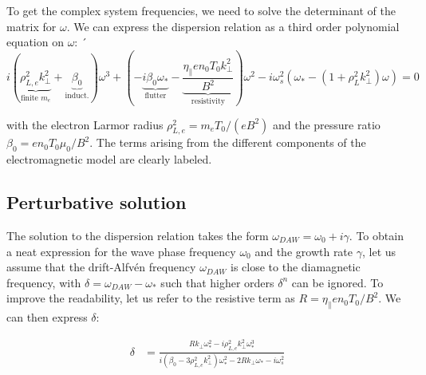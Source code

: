 To get the complex system frequencies, we need to solve the determinant of the matrix for $\omega$. We can express the dispersion relation as a third order polynomial equation on $\omega$:
´\begin{equation}
	\label{eq:edge_DAWdispersionRelation}
	i\left(\underbrace{\rho_{L,e}^2k_\perp^2}_{\text{finite }m_e} + \underbrace{\beta_0}_{\text{induct.}}\right)\omega^3 + \left(-\underbrace{i\beta_0\omega_*}_{\text{flutter}} - \underbrace{\frac{\eta_\parallel en_0T_0k_\perp^2}{B^2}}_{\text{resistivity}}\right)\omega^2 - i\omega_s^2\left(\omega_*-\left(1 + \rho_L^2 k_\perp^2\right)\omega\right) = 0
\end{equation}

with the electron Larmor radius $\rho_{L,e}^2 = m_eT_0/(eB^2)$ and the pressure ratio $\beta_0 = en_0T_0 \mu_0 / B^2$. The terms arising from the different components of the electromagnetic model are clearly labeled. 



\subsection{Perturbative solution}
\label{ssec:edge_DAW_perturbativeSolution}


The solution to the dispersion relation takes the form $\omega_{DAW} = \omega_0 +i\gamma$. To obtain a neat expression for the wave phase frequency $\omega_0$ and the growth rate $\gamma$, let us assume that the drift-Alfvén frequency $\omega_{DAW}$ is close to the diamagnetic frequency, with $\delta = \omega_{DAW} - \omega_*$ such that higher orders $\delta^n$ can be ignored. To improve the readability, let us refer to the resistive term as $R = \eta_\parallel en_0T_0/B^2$. We can then express $\delta$: 

\begin{align}
	\delta &= \frac{Rk_\perp\omega_*^2 - i\rho_{L,e}^2k_\perp^2\omega_*^3}{i\left(\beta_0 - 3\rho_{L,e}^2k_\perp^2\right)\omega_*^2 - 2Rk_\perp\omega_* - i\omega_s^2} %
\end{align}

